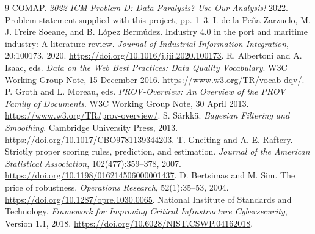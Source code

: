 \clearpage
\renewcommand{\refname}{\bi{References}{参考文献}}
\begin{thebibliography}{9}
 COMAP. \emph{2022 ICM Problem D: Data Paralysis? Use Our Analysis!} 2022. Problem statement supplied with this project, pp. 1--3.
 I. de la Pe\~na Zarzuelo, M. J. Freire Soeane, and B. L\'opez Berm\'udez. Industry 4.0 in the port and maritime industry: A literature review. \emph{Journal of Industrial Information Integration}, 20:100173, 2020. \url{https://doi.org/10.1016/j.jii.2020.100173}.
 R. Albertoni and A. Isaac, eds. \emph{Data on the Web Best Practices: Data Quality Vocabulary}. W3C Working Group Note, 15 December 2016. \url{https://www.w3.org/TR/vocab-dqv/}.
 P. Groth and L. Moreau, eds. \emph{PROV-Overview: An Overview of the PROV Family of Documents}. W3C Working Group Note, 30 April 2013. \url{https://www.w3.org/TR/prov-overview/}.
 S. S\"arkk\"a. \emph{Bayesian Filtering and Smoothing}. Cambridge University Press, 2013. \url{https://doi.org/10.1017/CBO9781139344203}.
 T. Gneiting and A. E. Raftery. Strictly proper scoring rules, prediction, and estimation. \emph{Journal of the American Statistical Association}, 102(477):359--378, 2007. \url{https://doi.org/10.1198/016214506000001437}.
 D. Bertsimas and M. Sim. The price of robustness. \emph{Operations Research}, 52(1):35--53, 2004. \url{https://doi.org/10.1287/opre.1030.0065}.
 National Institute of Standards and Technology. \emph{Framework for Improving Critical Infrastructure Cybersecurity}, Version 1.1, 2018. \url{https://doi.org/10.6028/NIST.CSWP.04162018}.
\end{thebibliography}
\medskip
{}

